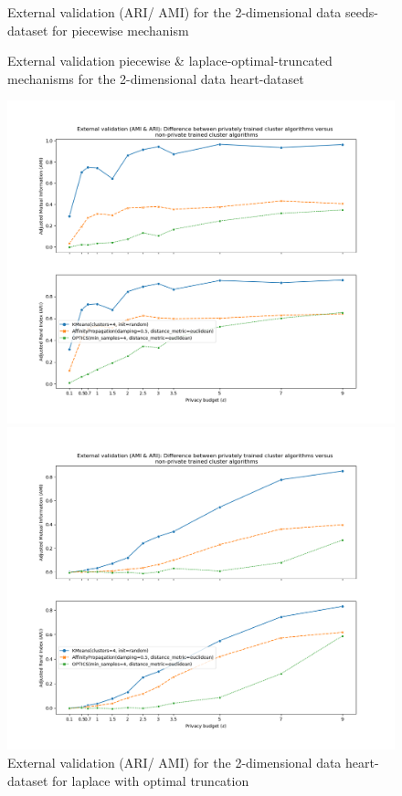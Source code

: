 \begin{figure}[!htbp]
\begin{minipage}[c]{0.49\textwidth}
        \caption{External validation (ARI/ AMI) for the 2-dimensional data seeds-dataset for piecewise mechanism}
        \label{fig:external-validation-seeds-dataset_comparison_2d-piecewise}
    \end{minipage}

\end{figure}
\begin{figure}[!htbp]
    \caption{External validation piecewise \& laplace-optimal-truncated mechanisms for the 2-dimensional data heart-dataset}
    \centering
    \begin{minipage}[c]{0.49\textwidth}
        \includegraphics[width=1\textwidth]{Results/2d-laplace-optimal-truncated/heart-dataset/ami-and-ari.png}
        \caption{External validation (ARI/ AMI) for the 2-dimensional data heart-dataset for laplace with optimal truncation}
        \label{fig:external-validation-heart-dataset_comparison_2d-laplace}
    \end{minipage}
    \begin{minipage}[c]{0.49\textwidth}
        \includegraphics[width=1\textwidth]{Results/2d-piecewise/heart-dataset/ami-and-ari.png}

\end{minipage}
\end{figure}
